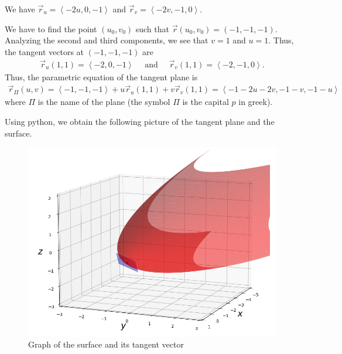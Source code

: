	\spc
	
	We have $\vec{r}_u = \left\langle -2u , 0, -1 \right\rangle$ and $\vec{r}_v = \left\langle -2v , -1 , 0 \right\rangle$. 
	
	We have to find the point $(u_0, v_0)$ such that $\vec{r}(u_0, v_0) = (-1, -1, -1)$. Analyzing the second and third components, we see that $v = 1$ and $u = 1$. Thus, the tangent vectors at $(-1, -1, -1)$ are
		\begin{align*}
		\vec{r}_u (1, 1) = \left\langle -2, 0, -1 \right\rangle \quad \text{ and } \quad \vec{r}_v (1, 1) = \left\langle -2, -1, 0 \right\rangle .
		\end{align*}
	Thus, the parametric equation of the tangent plane is
		\begin{align*}
		\vec{r}_{\Pi} (u, v) = \left\langle -1, -1, -1 \right\rangle + u \vec{r}_u (1, 1) + v \vec{r}_v (1, 1) = \left\langle -1 - 2u -2v , -1 - v , -1 - u \right\rangle 
		\end{align*}
	where $\Pi$ is the name of the plane (the symbol $\Pi$ is the capital $p$ in greek).
	
	Using python, we obtain the following picture of the tangent plane and the surface.
		\begin{figure}[h]
		\centering
		\includegraphics[scale=0.5]{picture6.png}
		\caption{Graph of the surface and its tangent vector}
		\end{figure}
	
